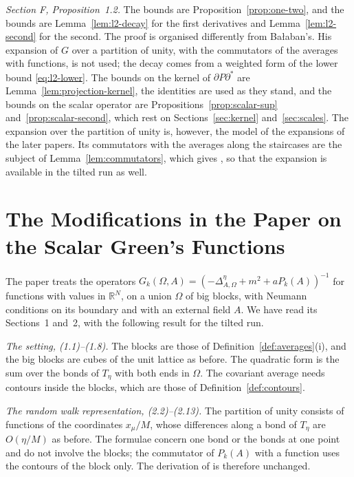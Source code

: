 \documentclass[11pt]{preprint}
\numberwithin{equation}{section}
\theoremstyle{definition}
\theoremstyle{remark}
\theoremstyle{plain}
\begin{document}
\emph{Section F, Proposition~1.2.} The bounds \cite[(1.110)--(1.113)]{BalabanPRT1} are Proposition~\ref{prop:one-two}, and the bounds \cite[(1.114)]{BalabanPRT1} are Lemma~\ref{lem:l2-decay} for the first derivatives and Lemma~\ref{lem:l2-second} for the second. The proof is organised differently from Ba{\l}aban's. His expansion \cite[(1.119)--(1.123)]{BalabanPRT1} of $G$ over a partition of unity, with the commutators \cite[(1.120), (1.121)]{BalabanPRT1} of the averages with functions, is not used; the decay comes from a weighted form of the lower bound \eqref{eq:l2-lower}. The bounds \cite[(1.126), (1.127)]{BalabanPRT1} on the kernel of $\partial P\partial^*$ are Lemma~\ref{lem:projection-kernel}, the identities \cite[(1.132), (1.133)]{BalabanPRT1} are used as they stand, and the bounds \cite[(1.135)--(1.137)]{BalabanPRT1} on the scalar operator are Propositions~\ref{prop:scalar-sup} and~\ref{prop:scalar-second}, which rest on Sections~\ref{sec:kernel} and~\ref{sec:scales}. The expansion over the partition of unity is, however, the model of the expansions of the later papers. Its commutators with the averages along the staircases are the subject of Lemma~\ref{lem:commutators}, which gives \cite[(1.128)]{BalabanPRT1}, so that the expansion is available in the tilted run as well.

\section{The Modifications in the Paper on the Scalar Green's Functions}\label{sec:rdg}

The paper \cite{BalabanRDG} treats the operators $G_k(\varOmega, A) = (-\Delta^{\eta}_{A,\varOmega} + m^2 + aP_k(A))^{-1}$ for functions with values in $\mathbb R^N$, on a union $\varOmega$ of big blocks, with Neumann conditions on its boundary and with an external field $A$. We have read its Sections~1 and~2, with the following result for the tilted run.

\emph{The setting, (1.1)--(1.8).} The blocks \cite[(1.1)]{BalabanRDG} are those of Definition~\ref{def:averages}(i), and the big blocks are cubes of the unit lattice as before. The quadratic form \cite[(1.3)]{BalabanRDG} is the sum over the bonds of $T_\eta$ with both ends in $\varOmega$. The covariant average \cite[(1.4)]{BalabanRDG} needs contours inside the blocks, which are those of Definition~\ref{def:contours}.

\emph{The random walk representation, (2.2)--(2.13).} The partition of unity consists of functions of the coordinates $x_\mu/M$, whose differences along a bond of $T_\eta$ are $O(\eta/M)$ as before. The formulae \cite[(2.3)--(2.5)]{BalabanRDG} concern one bond or the bonds at one point and do not involve the blocks; the commutator \cite[(2.8)]{BalabanRDG} of $P_k(A)$ with a function uses the contours of the block only. The derivation of \cite[(2.9)--(2.13)]{BalabanRDG} is therefore unchanged.
\end{document}
